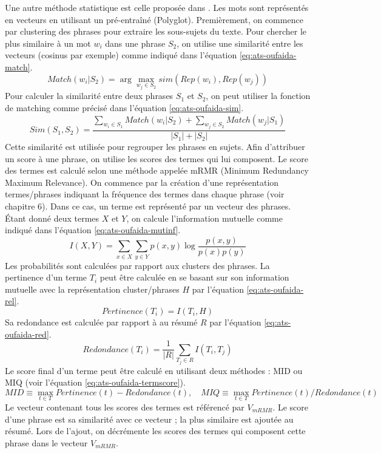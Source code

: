 \documentclass{KodeBook}
\begin{document}
Une autre méthode statistique est celle proposée dans \cite{15-oufaida-al}.
Les mots sont représentés en vecteurs en utilisant un  pré-entraîné (Polyglot).
Premièrement, on commence par clustering des phrases pour extraire les sous-sujets du texte. 
Pour chercher le plus similaire à un mot $w_i$ dans une phrase $S_2$, on utilise une similarité entre les vecteurs (cosinus par exemple) comme indiqué dans l'équation \ref{eq:ats-oufaida-match}.
\begin{equation}\label{eq:ats-oufaida-match}
Match(w_i | S_2) = \arg\max_{w_j \in S_2} sim(Rep(w_i), Rep(w_j))
\end{equation}
Pour calculer la similarité entre deux phrases $S_1$ et $S_2$, on peut utiliser la fonction de matching comme précisé dans l'équation \ref{eq:ats-oufaida-sim}.
\begin{equation}\label{eq:ats-oufaida-sim}
Sim(S_1, S_2) = \frac{\sum_{w_i \in S_1} Match(w_i | S_2) + \sum_{w_j \in S_2} Match(w_j | S_1)}{|S_1| + |S_2|}
\end{equation}
Cette similarité est utilisée pour regrouper les phrases en sujets. 
Afin d'attribuer un score à une phrase, on utilise les scores des termes qui lui composent. 
Le score des termes est calculé selon une méthode appelée mRMR (Minimum Redundancy Maximum Relevance). 
On commence par la création d'une représentation termes/phrases indiquant la fréquence des termes dans chaque phrase (voir chapitre 6). 
Dans ce cas, un terme est représenté par un vecteur des phrases. 
Étant donné deux termes $X$ et $Y$, on calcule l'information mutuelle comme indiqué dans l'équation \ref{eq:ats-oufaida-mutinf}.
\begin{equation}\label{eq:ats-oufaida-mutinf}
I(X, Y) = \sum\limits_{x \in X} \sum\limits_{y \in Y} p(x, y) \log \frac{p(x, y)}{p(x) p(y)}
\end{equation}
Les probabilités sont calculées par rapport aux clusters des phrases.
La pertinence d'un terme $T_i$ peut être calculée en se basant sur son information mutuelle avec la représentation cluster/phrases $H$ par l'équation \ref{eq:ats-oufaida-rel}.
\begin{equation}\label{eq:ats-oufaida-rel}
Pertinence(T_i) = I(T_i, H)
\end{equation}
Sa redondance est calculée par rapport à au résumé $R$ par l'équation \ref{eq:ats-oufaida-red}.
\begin{equation}\label{eq:ats-oufaida-red}
Redondance(T_i) = \frac{1}{|R|} \sum\limits_{T_j \in R} I(T_i, T_j)
\end{equation}
Le score final d'un terme peut être calculé en utilisant deux méthodes : MID ou MIQ (voir l'équation \ref{eq:ats-oufaida-termscore}).
\begin{equation}\label{eq:ats-oufaida-termscore}
MID \equiv \max_{t \in T} Pertinence(t) - Redondance(t), \quad
MIQ \equiv \max_{t \in T} Pertinence(t) / Redondance(t)
\end{equation}
Le vecteur contenant tous les scores des termes est référencé par $V_{mRMR}$. 
Le score d'une phrase est sa similarité avec ce vecteur ; la plus similaire est ajoutée au résumé. 
Lors de l'ajout, on décrémente les scores des termes qui composent cette phrase dans le vecteur $V_{mRMR}$. 
\end{document}
